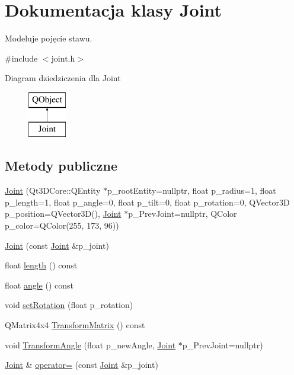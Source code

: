 \hypertarget{class_joint}{}\section{Dokumentacja klasy Joint}
\label{class_joint}


Modeluje pojęcie stawu.  




{\ttfamily \#include $<$joint.\+h$>$}

Diagram dziedziczenia dla Joint\begin{figure}[H]
\begin{center}
\leavevmode
\includegraphics[height=2.000000cm]{class_joint}
\end{center}
\end{figure}
\subsection*{Metody publiczne}
\begin{DoxyCompactItemize}
\item 
\hyperlink{class_joint_a0a60e63cceeb93ef8a308ebf2eaa8d68}{Joint} (Qt3\+D\+Core\+::\+Q\+Entity $\ast$p\+\_\+root\+Entity=nullptr, float p\+\_\+radius=1, float p\+\_\+length=1, float p\+\_\+angle=0, float p\+\_\+tilt=0, float p\+\_\+rotation=0, Q\+Vector3D p\+\_\+position=Q\+Vector3D(), \hyperlink{class_joint}{Joint} $\ast$p\+\_\+\+Prev\+Joint=nullptr, Q\+Color p\+\_\+color=Q\+Color(255, 173, 96))
\item 
\hyperlink{class_joint_a9652fa723eed6fe31e1ab4adccbb9c44}{Joint} (const \hyperlink{class_joint}{Joint} \&p\+\_\+joint)
\item 
float \hyperlink{class_joint_acf30d550f5ca1e0e5eb60dafdc83d202}{length} () const
\item 
float \hyperlink{class_joint_a305d99fa57d07d8ed3b478931e4e86e5}{angle} () const
\item 
void \hyperlink{class_joint_aab387e3e09c94b9e87d3b4c0e8f974aa}{set\+Rotation} (float p\+\_\+rotation)
\item 
Q\+Matrix4x4 \hyperlink{class_joint_a0bf632e9b7a8de79429be16f963e81f7}{Transform\+Matrix} () const
\item 
void \hyperlink{class_joint_ad2529cc3d781c18ead369c0ea42b700b}{Transform\+Angle} (float p\+\_\+new\+Angle, \hyperlink{class_joint}{Joint} $\ast$p\+\_\+\+Prev\+Joint=nullptr)
\item 
\hyperlink{class_joint}{Joint} \& \hyperlink{class_joint_a3cd9a9a2dc9226b2588c6ddab9659bed}{operator=} (const \hyperlink{class_joint}{Joint} \&p\+\_\+joint)
\end{DoxyCompactItemize}
